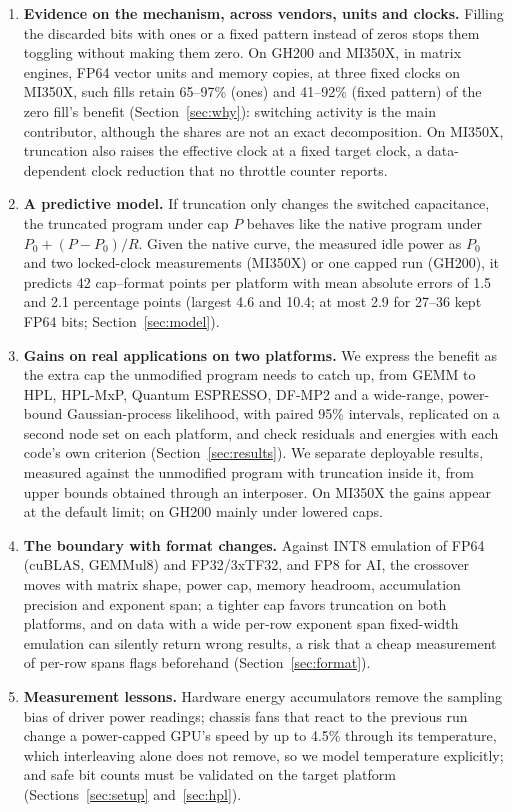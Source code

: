 \documentclass[conference]{IEEEtran}
\newcommand{\pct}{\%}
\begin{document}
\begin{enumerate}
\item \textbf{Evidence on the mechanism, across vendors, units and clocks.} Filling the discarded bits with ones or a
fixed pattern instead of zeros stops them toggling without making them zero. On GH200 and MI350X, in matrix engines,
FP64 vector units and memory copies, at three fixed clocks on MI350X, such fills retain 65--97\pct{} (ones) and
41--92\pct{} (fixed pattern) of the zero fill's benefit (Section~\ref{sec:why}): switching activity is the main
contributor, although the shares are not an exact decomposition. On MI350X, truncation also raises the effective clock
at a fixed target clock, a data-dependent clock reduction that no throttle counter reports.
\item \textbf{A predictive model.} If truncation only changes the switched capacitance, the truncated program under
cap $P$ behaves like the native program under $P_0+(P-P_0)/R$. Given the native curve, the measured idle power as $P_0$
and two locked-clock measurements (MI350X) or one capped run (GH200), it predicts 42 cap--format points per platform
with mean absolute errors of 1.5 and 2.1 percentage points (largest 4.6 and 10.4; at most 2.9 for 27--36 kept FP64
bits; Section~\ref{sec:model}).
\item \textbf{Gains on real applications on two platforms.} We express the benefit as the extra cap the unmodified
program needs to catch up, from GEMM to HPL, HPL-MxP, Quantum ESPRESSO, DF-MP2 and a wide-range, power-bound
Gaussian-process likelihood, with paired 95\pct{} intervals, replicated on a second node set on each platform, and check
residuals and energies with each code's own criterion (Section~\ref{sec:results}). We separate deployable results,
measured against the unmodified program with truncation inside it, from upper bounds obtained through an interposer.
On MI350X the gains appear at the default limit; on GH200 mainly under lowered caps.
\item \textbf{The boundary with format changes.} Against INT8 emulation of FP64 (cuBLAS, GEMMul8) and FP32/3xTF32,
and FP8 for AI, the crossover moves with matrix shape, power cap, memory headroom, accumulation precision and exponent
span; a tighter cap favors truncation on both platforms, and on data with a wide per-row exponent span fixed-width
emulation can silently return wrong results, a risk that a cheap measurement of per-row spans flags beforehand
(Section~\ref{sec:format}).
\item \textbf{Measurement lessons.} Hardware energy accumulators remove the sampling bias of driver power readings;
chassis fans that react to the previous run change a power-capped GPU's speed by up to 4.5\pct{} through its
temperature, which interleaving alone does not remove, so we model temperature explicitly; and safe bit counts must be
validated on the target platform (Sections~\ref{sec:setup} and~\ref{sec:hpl}).
\end{enumerate}
\end{document}
